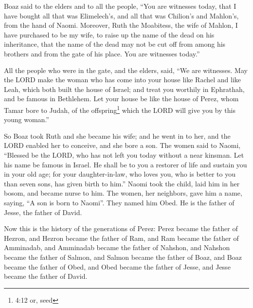 \myverse{}Boaz said to the elders and to all the people, “You are witnesses
today, that I have bought all that was Elimelech’s, and all that was Chilion’s and Mahlon’s, from the
hand of Naomi.
\myverse{}Moreover, Ruth the Moabitess, the wife of Mahlon, I have purchased to be my
wife, to raise up the name of the dead on his inheritance, that the name of the dead may not be cut off
from among his brothers and from the gate of his place. You are witnesses today.”

\myverse{}All the people who were in the gate, and the elders, said, “We
are witnesses. May the LORD make the woman who has come into your house like Rachel and like Leah, which
both built the house of Israel; and treat you worthily in Ephrathah, and be famous in Bethlehem.
\myverse{}Let your house be like the house of Perez, whom Tamar bore to Judah, of the
offspring\footnote{  4:12 or, seed} which the LORD will give you by this young woman.”

\myverse{}So Boaz took Ruth and she became his wife; and he went in to
her, and the LORD enabled her to conceive, and she bore a son.
\myverse{}The women said to Naomi, “Blessed be the LORD, who has not left you today
without a near kinsman. Let his name be famous in Israel.
\myverse{}He shall be to you a restorer of life and sustain you in your old age; for
your daughter-in-law, who loves you, who is better to you than seven sons, has given birth to him.”
\myverse{}Naomi took the child, laid him in her bosom, and became nurse to him.
\myverse{}The women, her neighbors, gave him a name, saying, “A son is born to Naomi”.
They named him Obed. He is the father of Jesse, the father of David.

\myverse{}Now this is the history of the generations of Perez: Perez became
the father of Hezron,
\myverse{}and Hezron became the father of Ram, and Ram became the father of Amminadab,
\myverse{}and Amminadab became the father of Nahshon, and Nahshon became the father
of Salmon,
\myverse{}and Salmon became the father of Boaz, and Boaz became the father of Obed,
\myverse{}and Obed became the father of Jesse, and Jesse became the father of David.

